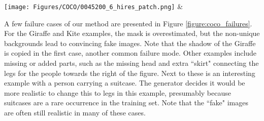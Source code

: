\documentclass[runningheads]{llncs}
\begin{document}
\texttt{[image: Figures/COCO/0045200\_6\_hires\_patch.png]} &%

A few failure cases of our method are presented in Figure \ref{figure:coco_failures}. For the Giraffe and Kite examples, the mask is overestimated, but the non-unique backgrounds lead to convincing fake images. Note that the shadow of the Giraffe is copied in the first case, another common failure mode.
Other examples include missing or added parts, such as the missing head and extra ``skirt" connecting the legs for the people towards the right of the figure. Next to these is an interesting example with a person carrying a suitcase. The generator decides it would be more realistic to change this to legs in this example, presumably because suitcases are a rare occurrence in the training set. 
Note that the ``fake" images are often still realistic in many of these cases.
\end{document}
